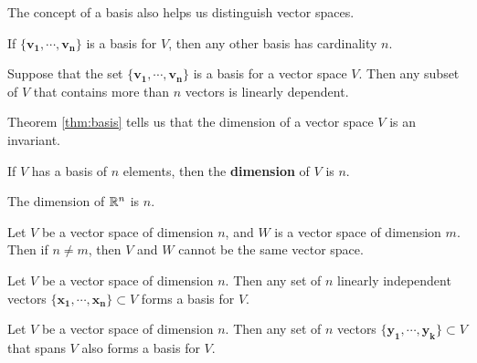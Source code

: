     
    
    
    
    
    
    
    
    
    
    The concept of a basis also helps us distinguish vector spaces.
    
    \begin{theorem}\label{thm:basis}
    If $\{\bm{v_1}, \cdots, \bm{v_n}\}$ is a basis for $V$, then any other basis has cardinality $n$.
    \end{theorem}
    
    \begin{lemma}
    Suppose that the set $\{\bm{v_1}, \cdots, \bm{v_n}\}$ is a basis for a vector space $V$.  Then any subset of $V$ that contains more than $n$ vectors is linearly dependent.
    \end{lemma}
    
    Theorem \ref{thm:basis} tells us that the dimension of a vector space $V$ is an invariant.  
    
    \begin{definition}
    If $V$ has a basis of $n$ elements, then the \textbf{dimension} of $V$ is $n$.
    \end{definition}
    
    \begin{example}
    The dimension of $\mathbb{R}^n$ is $n$.
    \end{example}
    
    \begin{corollary}
    Let $V$ be a vector space of dimension $n$, and $W$ is a vector space of dimension $m$.   Then if $n \neq m$, then $V$ and $W$ cannot be the same vector space.
    \end{corollary}
    
    
    \begin{proposition}
    Let $V$ be a vector space of dimension $n$.  Then any set of $n$ linearly independent vectors $\{\bm{x_1}, \cdots, \bm{x_n}\} \subset V$ forms a basis for $V$.
    \end{proposition}
    
    \begin{proposition}
    Let $V$ be a vector space of dimension $n$.  Then any set of $n$ vectors $\{\bm{y_1}, \cdots, \bm{y_k}\} \subset V$ that spans $V$ also forms a basis for $V$.
    \end{proposition}
    
